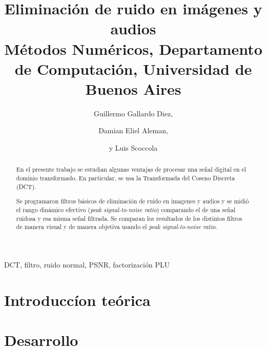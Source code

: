 \documentclass[%
	compressed,
	titlepage,
	narroweqnarray,
	inline,
	twoside,
	]{ieee}
\begin{document}
\title[Eliminaci\'on de ruido en im\'agenes y audios]{%
	Eliminaci\'on de ruido en im\'agenes y audios\\
{\small M\'etodos Num\'ericos, Departamento de Computaci\'on, Universidad de Buenos Aires}
}

\author[ALEMAN, G. DIEZ Y SCOCCOLA]{
Guillermo Gallardo Diez,\and{}Damian Eliel Aleman,\and{}y Luis Scoccola
}



\maketitle               
\tableofcontents

\newpage

\begin{abstract} 
	En el presente trabajo se estudian algunas ventajas de
	procesar una se\~nal digital en el dominio transformado. En
	particular, se usa la Transformada del Coseno Discreta (DCT).
	
	Se programaron filtros b\'asicos de eliminaci\'on
	de ruido en imagenes y audios y
	se midi\'o el rango din\'amico efectivo
	({\em peak signal-to-noise ratio}) comparando el
	de una se\~nal ruidosa y esa misma se\~nal filtrada.
	Se comparan
	los resultados de los distintos filtros de manera visual
	y de manera objetiva usando el {\em peak signal-to-noise ratio}.
\end{abstract}

\begin{keywords}
	DCT, filtro, ruido normal, PSNR, factorizaci\'on PLU
\end{keywords}

\section{Introducc\'ion te\'orica}


 
\section{Desarrollo}
\end{document}
